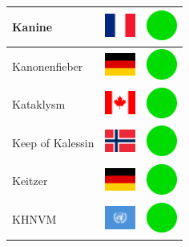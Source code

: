 \documentclass[12pt, a4paper, twoside]{report}
\begin{document}
\begin{center}
\begin{longtable}{|p{5cm}|p{2cm}|p{2cm}|}
 Kanine                                                     & \includegraphics[width=1cm]{../img/flags/fr} &   \includegraphics[width=1cm]{../likes/y} \\ \hline
 Kanonenfieber                                              & \includegraphics[width=1cm]{../img/flags/de} &   \includegraphics[width=1cm]{../likes/y} \\ \hline
 Kataklysm                                                  & \includegraphics[width=1cm]{../img/flags/ca} &   \includegraphics[width=1cm]{../likes/y} \\ \hline
 Keep of Kalessin                                           & \includegraphics[width=1cm]{../img/flags/no} &   \includegraphics[width=1cm]{../likes/y} \\ \hline
 Keitzer                                                    & \includegraphics[width=1cm]{../img/flags/de} &   \includegraphics[width=1cm]{../likes/y} \\ \hline
 KHNVM                                                      & \includegraphics[width=1cm]{../img/flags/un} &   \includegraphics[width=1cm]{../likes/y} \\ \hline

\end{longtable}
\end{center}
\end{document}
